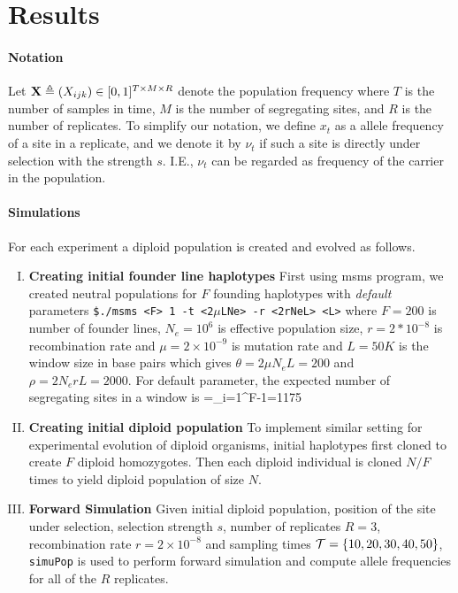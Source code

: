 \documentclass[11pt]{article}
\begin{document}
\section{Results}
\paragraph{Notation} Let ${\mathbf X} \triangleq (X_{ijk}) \in [0, 1]^{T \times 
M\times R}$ denote the population frequency where $T$ is the number of samples 
in time, $M$ is the number of segregating sites, and $R$ is the number of 
replicates.
To simplify our notation, we define $x_t$ as a allele frequency of a site in a
 replicate, and we denote it by $\nu_t$ if such a site is directly under 
 selection with the strength $s$. I.E., $\nu_t$ can be regarded as frequency of 
 the carrier in the  population.
\paragraph{Simulations}
For each experiment a diploid population is created and evolved as follows. 
\begin{enumerate}[I.]
	\item {\bf Creating initial founder line haplotypes}
	First using msms program, we created neutral populations for $F$ founding 
	haplotypes with \emph{default} parameters \texttt{\$./msms <F> 1 -t 
	<2$\mu$LNe> 
		-r <2rNeL> 
		<L>} 
	where $F=200$ is number of founder lines, $N_e=10^6$ is 
	effective 
	population size, $r=2*10^{-8}$ is recombination rate and $\mu=2\times 
	10^{-9}$ is mutation rate and  $L=50K$ is the window size in base pairs 
	which gives $\theta=2\mu N_eL=200$ and $\rho=2N_erL=2000$. For default 
	parameter, the expected number of segregating sites in a window is 
	\beqq
	\Ebb[M]=\theta \sum_{i=1}^{F-1}=1175
	\eeqq
	\item{\bf Creating initial diploid population} 
	To implement similar setting for experimental evolution of diploid 
	organisms, 
	initial  haplotypes first cloned to create $F$ diploid homozygotes. Then 
	each 
	diploid individual is  cloned $N/F$ times to yield diploid population of 
	size 
	$N$.
	\item{\bf Forward Simulation}
	Given initial diploid population, position of the site under selection, 
	selection 
	strength $s$, number of replicates $R=3$, recombination rate 
	$r=2\times10^{-8}$ 
	and sampling times ${\cal T}=\{10,20,30,40,50\}$, \texttt{simuPop} is used to 
	perform
	forward simulation and  compute allele frequencies for all of the $R$ 
	replicates.
\end{enumerate}
\end{document}
